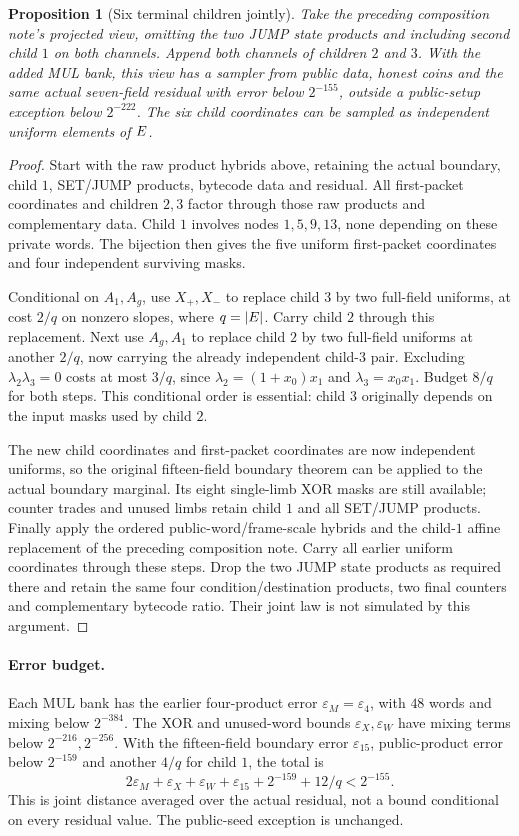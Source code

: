 \documentclass[11pt]{article}
\newtheorem{proposition}{Proposition}
\begin{document}
\begin{proposition}[Six terminal children jointly]
Take the preceding composition note's projected view, omitting the two JUMP state products and including second child $1$ on both channels. Append both channels of children $2$ and $3$. With the added MUL bank, this view has a sampler from public data, honest coins and the same actual seven-field residual with error below $2^{-155}$, outside a public-setup exception below $2^{-222}$. The six child coordinates can be sampled as independent uniform elements of $E$.
\end{proposition}
\begin{proof}
Start with the raw product hybrids above, retaining the actual boundary, child $1$, SET/JUMP products, bytecode data and residual. All first-packet coordinates and children $2,3$ factor through those raw products and complementary data. Child $1$ involves nodes $1,5,9,13$, none depending on these private words. The bijection then gives the five uniform first-packet coordinates and four independent surviving masks.

Conditional on $A_1,A_g$, use $X_+,X_-$ to replace child $3$ by two full-field uniforms, at cost $2/q$ on nonzero slopes, where $q=|E|$. Carry child $2$ through this replacement. Next use $A_g,A_1$ to replace child $2$ by two full-field uniforms at another $2/q$, now carrying the already independent child-$3$ pair. Excluding $\lambda_2\lambda_3=0$ costs at most $3/q$, since $\lambda_2=(1+x_0)x_1$ and $\lambda_3=x_0x_1$. Budget $8/q$ for both steps. This conditional order is essential: child $3$ originally depends on the input masks used by child $2$.

The new child coordinates and first-packet coordinates are now independent uniforms, so the original fifteen-field boundary theorem can be applied to the actual boundary marginal. Its eight single-limb XOR masks are still available; counter trades and unused limbs retain child $1$ and all SET/JUMP products. Finally apply the ordered public-word/frame-scale hybrids and the child-$1$ affine replacement of the preceding composition note. Carry all earlier uniform coordinates through these steps. Drop the two JUMP state products as required there and retain the same four condition/destination products, two final counters and complementary bytecode ratio. Their joint law is not simulated by this argument.
\end{proof}

\paragraph{Error budget.} Each MUL bank has the earlier four-product error $\varepsilon_M=\varepsilon_4$, with $48$ words and mixing below $2^{-384}$. The XOR and unused-word bounds $\varepsilon_X,\varepsilon_W$ have mixing terms below $2^{-216},2^{-256}$. With the fifteen-field boundary error $\varepsilon_{15}$, public-product error below $2^{-159}$ and another $4/q$ for child $1$, the total is
\[
 2\varepsilon_M+\varepsilon_X+\varepsilon_W+\varepsilon_{15}
       +2^{-159}+12/q<2^{-155}.
\]
This is joint distance averaged over the actual residual, not a bound conditional on every residual value. The public-seed exception is unchanged.
\end{document}

